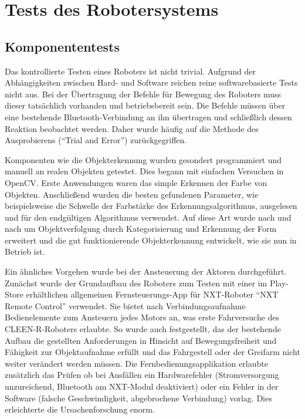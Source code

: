 \chapter{Tests des Robotersystems}
\label{cha:Tests}

\section{Komponententests}

Das kontrollierte Testen eines Roboters ist nicht trivial. Aufgrund der Abhängigkeiten zwischen Hard- und Software reichen reine softwarebasierte Tests nicht aus. Bei der Übertragung der Befehle für Bewegung des Roboters  muss dieser tatsächlich vorhanden und betriebsbereit sein. Die Befehle müssen über eine bestehende Bluetooth-Verbindung an ihn übertragen und schließlich dessen Reaktion beobachtet werden. Daher wurde häufig auf die Methode des Ausprobierens (\enquote{Trial and Error}) zurückgegriffen. 

Komponenten wie die Objekterkennung wurden gesondert programmiert und manuell an realen Objekten getestet. Dies begann mit einfachen Versuchen in OpenCV. Erste Anwendungen waren das simple Erkennen der Farbe von Objekten. Anschließend wurden die besten gefundenen Parameter, wie beispielsweise  die Schwelle der Farbstärke des Erkennungsalgorithmus, ausgelesen und für den endgültigen Algorithmus verwendet. Auf diese Art wurde nach und nach um Objektverfolgung durch Kategorisierung und Erkennung der Form erweitert und die gut funktionierende Objekterkennung entwickelt, wie sie nun in Betrieb ist.

Ein ähnliches Vorgehen wurde bei der Ansteuerung der Aktoren durchgeführt. Zunächst wurde der Grundaufbau des Roboters zum Testen mit einer im Play-Store erhältlichen allgemeinen Fernsteuerungs-App für NXT-Roboter \enquote{NXT Remote Control} \cite{nxt_remote_control} verwendet. Sie bietet nach Verbindungsaufnahme Bedienelemente zum Ansteuern jedes Motors an, was erste Fahrversuche des CLEEN-R-Roboters erlaubte. So wurde auch festgestellt, das der bestehende Aufbau die gestellten Anforderungen in Hinsicht auf Bewegungsfreiheit und Fähigkeit zur Objektaufnahme erfüllt und das Fahrgestell oder der Greifarm nicht weiter verändert werden müssen. Die Fernbedienungsapplikation erlaubte zusätzlich das Prüfen ob bei Ausfällen ein Hardwarefehler (Stromversorgung unzureichend, Bluetooth am NXT-Modul deaktiviert) oder ein Fehler in der Software (falsche Geschwindigkeit, abgebrochene Verbindung) vorlag. Dies erleichterte die Ursachenforschung enorm.

